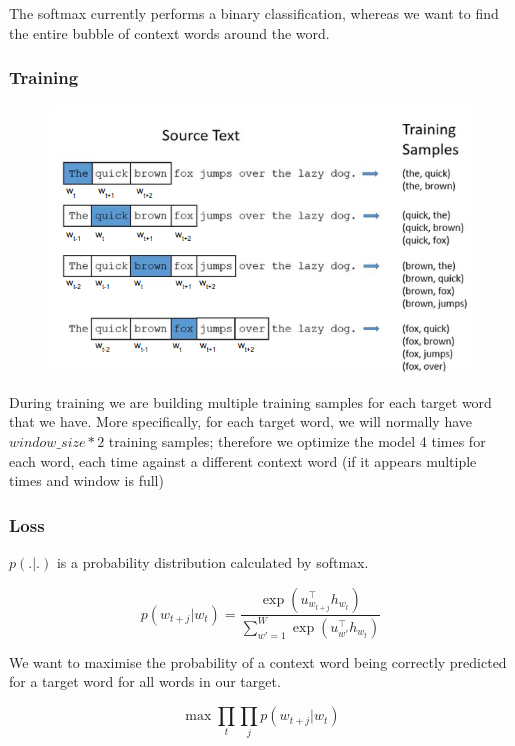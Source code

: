 \documentclass[11pt]{article}
\begin{document}
The softmax currently performs a binary classification, whereas we want to find the entire bubble of context words around the word.

\subsubsection{Training}

\begin{figure}[H]
    \centering
    \includegraphics[trim={0 0 0 5px}, clip, width=.8\linewidth]{figures/training-skip-gram.png}
\end{figure}

During training we are building multiple training samples for each target word that we have. More specifically, for each target word, we will normally have $window\_size*2$ training samples; therefore we optimize the model 4 times for each word, each time against a different context word (if it appears multiple times and window is full)

\subsubsection{Loss}

$p(.|.)$ is a probability distribution calculated by softmax.

\begin{equation}
    p(w_{t+j}|w_t) = \frac{\exp({u_{w_{t+j}}^\top h_{w_t}})}{\sum^W_{w'=1} \exp({u_{w'}^\top h_{w_t}})}
    \label{eq:softmax-problem}
\end{equation}

We want to maximise the probability of a context word being correctly predicted for a target word for all words in our target. 

\begin{equation*}
    \max \prod_t \prod_j p(w_{t+j}|w_t)
\end{equation*}
\end{document}
